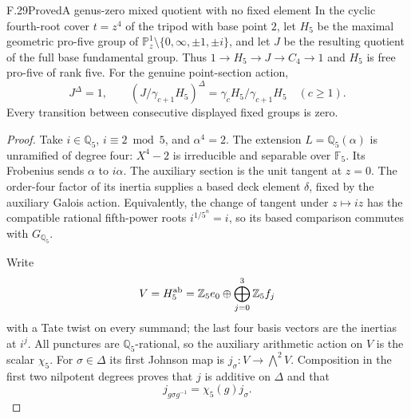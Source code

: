 \begin{statement}{F.29}{Proved}{A genus-zero mixed quotient with no fixed element}
In the cyclic fourth-root cover $t=z^4$ of the
tripod with base point $2$, let $H_5$ be the
maximal geometric pro-five group of
$\mathbb P^1_z\setminus\{0,\infty,\pm1,\pm i\}$,
and let $J$ be the resulting quotient of the
full base fundamental group.  Thus
$1\to H_5\to J\to C_4\to1$ and $H_5$ is free
pro-five of rank five.
For the genuine point-section action,
\[
 J^\Delta=1,\qquad
 (J/\gamma_{c+1}H_5)^\Delta
       =\gamma_cH_5/\gamma_{c+1}H_5
                         \quad(c\ge1).                    \tag{F.29.1}
\]
Every transition between consecutive displayed
fixed groups is zero.
\end{statement}
\begin{proof}
Take $i\in\mathbb Q_5$, $i\equiv2\bmod5$,
and $\alpha^4=2$.
The extension $L=\mathbb Q_5(\alpha)$
is unramified of degree four: $X^4-2$
is irreducible and separable over
$\mathbb F_5$.
Its Frobenius sends $\alpha$ to $i\alpha$.
The auxiliary section is the unit tangent
at $z=0$.  The order-four factor of its
inertia supplies a based deck element
$\delta$, fixed by the auxiliary Galois
action.  Equivalently, the change of
tangent under $z\mapsto iz$ has the
compatible rational fifth-power roots
$i^{1/5^n}=i$, so its based comparison
commutes with $G_{\mathbb Q_5}$.

Write
\[
 V=H_5^{\rm ab}
   =\mathbb Z_5 e_0\oplus
                    \bigoplus_{j=0}^3\mathbb Z_5 f_j
\]
with a Tate twist on every summand;
the last four basis vectors are the
inertias at $i^j$.
All punctures are $\mathbb Q_5$-rational,
so the auxiliary arithmetic action on
$V$ is the scalar $\chi_5$.
For $\sigma\in\Delta$ its first
Johnson map is
$j_\sigma:V\to\bigwedge^2V$.
Composition in the first two
nilpotent degrees proves that
$j$ is additive on $\Delta$
and that
\[
 j_{g\sigma g^{-1}}=\chi_5(g)j_\sigma.                      \tag{F.29.2}
\]


\end{proof}
